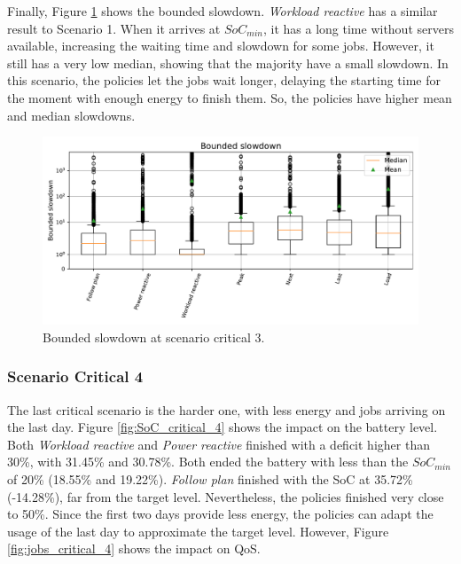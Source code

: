Finally, Figure \ref{fig:slowdown_critical_3} shows the bounded slowdown. \emph{Workload reactive} has a similar result to Scenario 1. When it arrives at $SoC_{min}$, it has a long time without servers available, increasing the waiting time and slowdown for some jobs. However, it still has a very low median, showing that the majority have a small slowdown. In this scenario, the policies let the jobs wait longer, delaying the starting time for the moment with enough energy to finish them. So, the policies have higher mean and median slowdowns. 

\begin{figure}[!htb]
    \centering
    \includegraphics[scale=0.55]{Images/Compensations/slowdown_critical_3.pdf}
    \caption{Bounded slowdown at scenario critical 3.}
    \label{fig:slowdown_critical_3}
\end{figure}

\clearpage

\subsubsection{Scenario Critical 4}

The last critical scenario is the harder one, with less energy and jobs arriving on the last day. Figure \ref{fig:SoC_critical_4} shows the impact on the battery level. Both \emph{Workload reactive} and \emph{Power reactive} finished with a deficit higher than 30\%, with 31.45\% and 30.78\%. Both ended the battery with less than the $SoC_{min}$ of 20\% (18.55\% and 19.22\%). \emph{Follow plan} finished with the SoC at 35.72\% (-14.28\%), far from the target level. Nevertheless, the policies finished very close to 50\%. Since the first two days provide less energy, the policies can adapt the usage of the last day to approximate the target level. However, Figure \ref{fig:jobs_critical_4} shows the impact on QoS.

